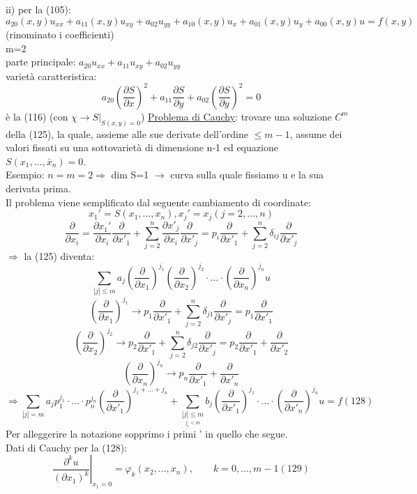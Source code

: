\documentclass[a4paper,11pt]{report}
\newcommand{\x}{\bar{x}}
\begin{document}
ii) per la (105):
$$
a_{20}(x,y)u_{xx}+a_{11}(x,y)u_{xy} + a_{02}u_{yy} + a_{10}(x,y)u_x + a_{01}(x,y)u_y + a_{00}(x,y)u = f(x,y)
$$
(rinominato i coefficienti)\\
m=2\\
parte principale: $a_{20}u_{xx} + a_{11}u_{xy} + a_{02}u_{yy} $\\
varietà caratteristica:
$$
a_{20}\left(\dfrac{\partial S}{\partial x}\right)^2 + a_{11}\dfrac{\partial S}{\partial y} + a_{02}\left(\dfrac{\partial S}{\partial y}\right)^2=0
$$
è la (116) (con $\chi \rightarrow S|_{S(x,y)=0}$)
\underline{Problema di Cauchy}: trovare una soluzione $C^m$ della (125), la quale, assieme alle sue derivate dell'ordine $\leq m-1$, assume dei valori fissati su una sottovarietà di dimensione n-1 ed equazione $S(x_1,\dots,\x_n)=0$.\\
Esempio: $n=m=2 \Rightarrow $ dim S=1 $\rightarrow$ curva sulla quale fissiamo u e la sua derivata prima.\\
Il problema viene semplificato dal seguente cambiamento di coordinate:
$$
x_1'=S(x_1,\dots,x_n), x_j'=x_j (j=2,\dots,n)
$$
$$
\dfrac{\partial}{\partial x_i} = \dfrac{\partial x_1'}{\partial x_i}\dfrac{\partial}{\partial x'_1}+\sum_{j=2}^n \dfrac{\partial x'_j}{\partial x_i}\dfrac{\partial}{\partial x'_j}=p_i\dfrac{\partial}{\partial x'_1} + \sum_{j=2}^n \delta_{ij} \dfrac{\partial}{\partial x'_j}
$$
$\Rightarrow$ la (125) diventa:
$$
\sum_{|j| \leq m} a_j\left(\dfrac{\partial}{\partial x_1}\right)^{j_1}\left(\dfrac{\partial}{\partial x_2}\right)^{j_2}\cdot \dots\cdot \left(\dfrac{\partial}{\partial x_n}\right)^{j_n}u
$$
$$
\left(\dfrac{\partial}{\partial x_1}\right)^{j_1} \rightarrow p_1\dfrac{\partial}{\partial x'_1} + \sum_{j=2}^n \delta_{j1}\dfrac{\partial}{\partial x'_j} = p_1\dfrac{\partial}{\partial x'_1}
$$
$$
\left(\dfrac{\partial}{\partial x_2}\right)^{j_2} \rightarrow p_2\dfrac{\partial}{\partial x'_1} + \sum_{j=2}^n \delta_{j2}\dfrac{\partial}{\partial x'_j} = p_2\dfrac{\partial}{\partial x'_1} + \dfrac{\partial}{\partial x'_2}
$$
$$
\left(\dfrac{\partial}{\partial x_n}\right)^{j_n} \rightarrow p_n\dfrac{\partial}{\partial x'_1} + \dfrac{\partial}{\partial x'_n}
$$
\begin{equation}
\Rightarrow \sum_{|j|=m} a_j p_1^{j_1}\cdot \dots \cdot p_n^{j_n}\left(\dfrac{\partial}{\partial x'_1}\right)^{j_1 + \dots  + j_n} + \sum_{\underset{j_1<m}{|j|\leq m}}b_j\left(\dfrac{\partial}{\partial x'_1}\right)^{j_1} \cdot \dots \cdot \left(\dfrac{\partial}{\partial x'_n}\right)^{j_n}u=f (128)
\end{equation}
Per alleggerire la notazione sopprimo i primi ' in quello che segue.\\
Dati di Cauchy per la (128):
\begin{equation}
\left.\dfrac{\partial^k u}{(\partial x_1)^k}\right|_{x_1=0}=\varphi_k(x_2,\dots, x_n) , \qquad k=0,\dots,m-1 (129)
\end{equation}
\end{document}
